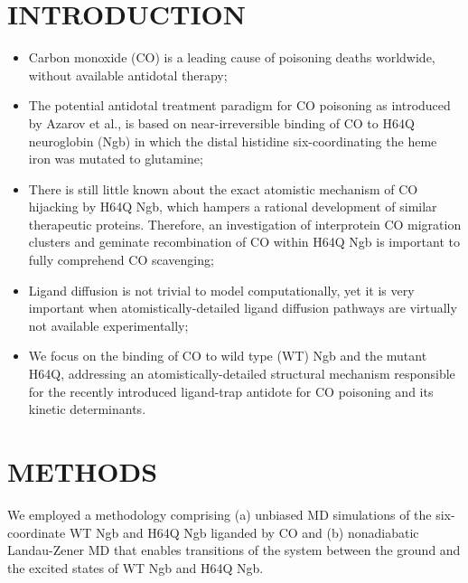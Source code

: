 \documentclass[a0,portrait]{a0poster}
\newcommand{\bi}{\item[\color{myblue}\ding{108}]}
\begin{document}
\begin{multicols}{2}

\section*{\centering\color{myblue} INTRODUCTION}

\begin{itemize}
\setlength\itemsep{0.6cm}
\bf
	\bi Carbon monoxide (CO) is a leading cause of poisoning deaths worldwide, without available antidotal therapy;
	\bi The potential antidotal treatment paradigm for CO poisoning as introduced by Azarov et al.\cite{0}, is based on near-irreversible binding of CO to H64Q neuroglobin (Ngb) in which the distal histidine six-coordinating the heme iron was mutated to glutamine;
	\bi There is still little known about the exact atomistic mechanism of CO hijacking by H64Q Ngb, which hampers a rational development of similar therapeutic proteins. Therefore, an investigation of interprotein CO migration clusters and geminate recombination of CO within H64Q Ngb is important to fully comprehend CO scavenging;
	\bi Ligand diffusion is not trivial to model computationally, yet it is very important when atomistically-detailed ligand diffusion pathways are virtually not available experimentally\cite{1,2,3,4};
	\bi We focus on the binding of CO to wild type (WT) Ngb and the mutant H64Q, addressing an atomistically-detailed structural mechanism responsible for the recently introduced ligand-trap antidote for CO poisoning and its kinetic determinants.
	
\end{itemize}

\section*{\centering\color{myblue} METHODS}

We employed a methodology comprising (a) unbiased MD simulations of the six-coordinate WT Ngb and H64Q Ngb liganded by CO and (b) nonadiabatic Landau-Zener MD that enables transitions of the system between the ground and the excited states of WT Ngb and H64Q Ngb.

\vspace{1cm}


\end{multicols}
\end{document}
